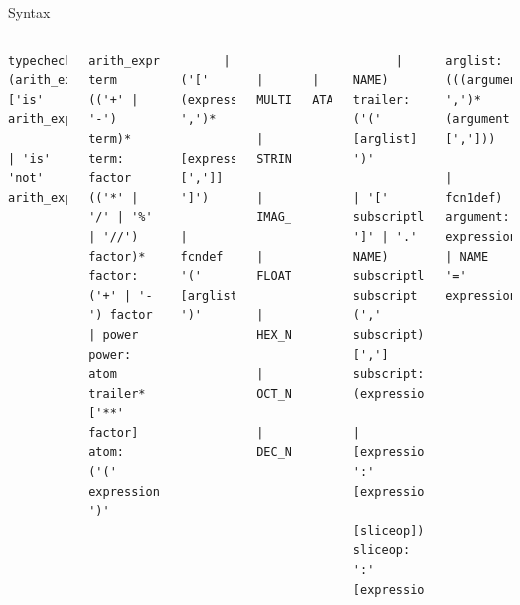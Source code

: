\documentclass{beamer}
\begin{document}
\begin{frame}[fragile]{Syntax}
\begin{columns}[t]
\tiny{}
\begin{verbatim}typecheck: (arith_expr ['is' arith_expr
             | 'is' 'not' arith_expr])
\end{verbatim}
\vspace{-0.8 cm}
\begin{verbatim}arith_expr: term (('+' | '-') term)*
term: factor (('*' | '/' | '%' | '//') factor)*
factor: ('+' | '-') factor | power
power: atom trailer* ['**' factor]
atom: ('(' expression ')'
\end{verbatim}
\vspace{-0.8 cm}
\begin{verbatim}      | ('[' (expression ',')*
             [expression [',']] ']')
       | fcndef '(' [arglist] ')'
\end{verbatim}
\vspace{-0.8 cm}
\begin{verbatim}      | MULTILINESTRING
       | STRING
       | IMAG_NUMBER
       | FLOAT_NUMBER
       | HEX_NUMBER
       | OCT_NUMBER
       | DEC_NUMBER
\end{verbatim}
\vspace{-0.8 cm}
\begin{verbatim}      | ATARG
\end{verbatim}
\vspace{-0.8 cm}
\begin{verbatim}      | NAME)
trailer: ('(' [arglist] ')'
           | '[' subscriptlist ']' | '.' NAME)
subscriptlist: subscript (',' subscript)* [',']
subscript: (expression
           | [expression] ':' [expression]
             [sliceop])
sliceop: ':' [expression]
\end{verbatim}
\vspace{-0.8 cm}
\begin{verbatim}arglist: (((argument ',')* (argument [',']))
           | fcn1def)
argument: expression | NAME '=' expression
\end{verbatim}
\end{columns}
\end{frame}
\end{document}
